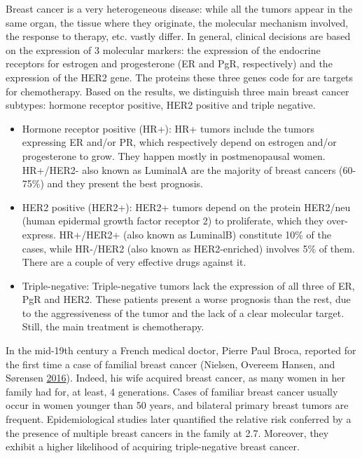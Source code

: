 \documentclass[
  11pt,
]{env/yjiao}
\providecommand{\tightlist}{%
  \setlength{\itemsep}{0pt}\setlength{\parskip}{0pt}}
\begin{document}
Breast cancer is a very heterogeneous disease: while all the tumors appear in the same organ, the tissue where they originate, the molecular mechanism involved, the response to therapy, etc. vastly differ. In general, clinical decisions are based on the expression of 3 molecular markers: the expression of the endocrine receptors for estrogen and progesterone (ER and PgR, respectively) and the expression of the HER2 gene. The proteins these three genes code for are targets for chemotherapy. Based on the results, we distinguish three main breast cancer subtypes: hormone receptor positive, HER2 positive and triple negative.

\begin{itemize}
\tightlist
\item
  Hormone receptor positive (HR+): HR+ tumors include the tumors expressing ER and/or PR, which respectively depend on estrogen and/or progesterone to grow. They happen mostly in postmenopausal women. HR+/HER2- also known as LuminalA are the majority of breast cancers (60-75\%) and they present the best prognosis.
\item
  HER2 positive (HER2+): HER2+ tumors depend on the protein HER2/neu (human epidermal growth factor receptor 2) to proliferate, which they over-express. HR+/HER2+ (also known as LuminalB) constitute 10\% of the cases, while HR-/HER2 (also known as HER2-enriched) involves 5\% of them. There are a couple of very effective drugs against it.
\item
  Triple-negative: Triple-negative tumors lack the expression of all three of ER, PgR and HER2. These patients present a worse prognosis than the rest, due to the aggressiveness of the tumor and the lack of a clear molecular target. Still, the main treatment is chemotherapy.
\end{itemize}

In the mid-19th century a French medical doctor, Pierre Paul Broca, reported for the first time a case of familial breast cancer (Nielsen, Overeem Hansen, and Sørensen \protect\hyperlink{ref-nielsen_hereditary_2016}{2016}). Indeed, his wife acquired breast cancer, as many women in her family had for, at least, 4 generations. Cases of familiar breast cancer usually occur in women younger than 50 years, and bilateral primary breast tumors are frequent. Epidemiological studies later quantified the relative risk conferred by a the presence of multiple breast cancers in the family at 2.7. Moreover, they exhibit a higher likelihood of acquiring triple-negative breast cancer.
\end{document}
